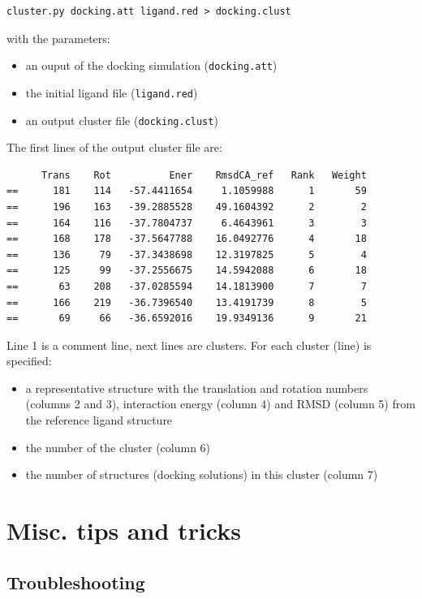 \documentclass[12pt,a4paper]{article}
\begin{document}
\begin{verbatim}
cluster.py docking.att ligand.red > docking.clust
\end{verbatim}

with the parameters:
\begin{itemize}
\item an ouput of the docking simulation ({\tt docking.att})
\item the initial ligand file ({\tt ligand.red})
\item an output cluster file ({\tt docking.clust})
\end{itemize}

The first lines of the output cluster file are:
\linenumbers
\begin{verbatim}
      Trans    Rot          Ener    RmsdCA_ref   Rank   Weight
==      181    114   -57.4411654     1.1059988      1       59
==      196    163   -39.2885528    49.1604392      2        2
==      164    116   -37.7804737     6.4643961      3        3
==      168    178   -37.5647788    16.0492776      4       18
==      136     79   -37.3438698    12.3197825      5        4
==      125     99   -37.2556675    14.5942088      6       18
==       63    208   -37.0285594    14.1813900      7        7
==      166    219   -36.7396540    13.4191739      8        5
==       69     66   -36.6592016    19.9349136      9       21
\end{verbatim}
\nolinenumbers

Line 1 is a comment line, next lines are clusters. For each cluster (line)
is specified:
\begin{itemize}
\item a representative structure with the translation and rotation
numbers (columns 2 and 3), interaction energy (column 4) and RMSD (column
5) from the reference ligand structure
\item the number of the cluster (column 6)
\item the number of structures (docking solutions) in this cluster (column
7)
\end{itemize}

\section{Misc. tips and tricks}


\subsection{Troubleshooting}
\end{document}
